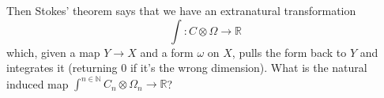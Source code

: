 \begin{exerciseset}
\begin{exercisepoints}
Then Stokes' theorem says that we have an extranatural transformation
\[
\int : C \otimes \Omega \to \mathbb R
\] which, given a map $Y \to X$ and a form $\omega$ on $X$, pulls the form back to $Y$ and integrates it (returning $0$ if it's the wrong dimension). What is the natural induced map $\int^{n \in \mathbb{N}} C_n \otimes \Omega_n \to \mathbb R$?
\end{exercisepoints}
\end{exerciseset}
